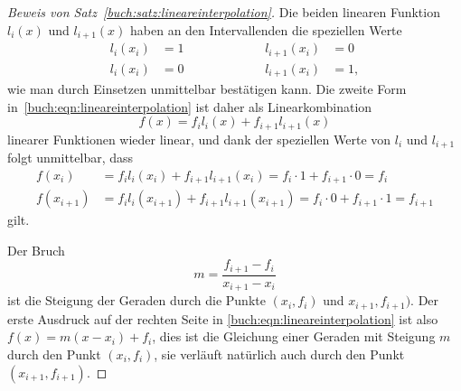 \begin{proof}[Beweis von Satz~\ref{buch:satz:lineareinterpolation}]
Die beiden linearen Funktion $l_i(x)$ und $l_{i+1}(x)$ haben an den 
Intervallenden die speziellen Werte
\[
\begin{aligned}
l_i(x_i)&=1  &\qquad&\qquad& l_{i+1}(x_i)&=0 \\
l_i(x_i)&=0  &\qquad&\qquad& l_{i+1}(x_i)&=1,
\end{aligned}
\]
wie man durch Einsetzen unmittelbar bestätigen kann.
Die zweite Form in~\eqref{buch:eqn:lineareinterpolation}
ist daher als Linearkombination
\[
f(x)=f_il_i(x) + f_{i+1}l_{i+1}(x)
\]
linearer Funktionen wieder
linear, und dank der speziellen Werte von $l_i$ und $l_{i+1}$ folgt
unmittelbar, dass
\begin{align*}
f(x_i)&=f_il_i(x_i) + f_{i+1}l_{i+1}(x_i) = f_i\cdot 1 + f_{i+1}\cdot 0= f_i\\
f(x_{i+1})&=f_il_i(x_{i+1}) + f_{i+1}l_{i+1}(x_{i+1})= f_i\cdot 0 + f_{i+1}\cdot 1=f_{i+1}
\end{align*}
gilt.

Der Bruch
%
\[
m = \frac{f_{i+1}-f_i}{x_{i+1}-x_i}
\]
ist die Steigung der Geraden durch die Punkte $(x_i,f_i)$ und
$x_{i+1},f_{i+1})$.
%
Der erste Ausdruck auf der rechten Seite in
\eqref{buch:eqn:lineareinterpolation} ist
also $f(x)=m(x-x_i)+f_i$, dies ist die Gleichung einer Geraden
mit Steigung $m$ durch den Punkt $(x_i,f_i)$, sie verläuft natürlich
auch durch den Punkt $(x_{i+1},f_{i+1})$.
%
\end{proof}


